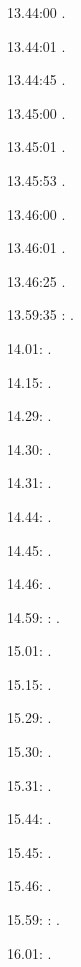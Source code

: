 \documentclass[italian]{article}
\begin{document}
13.44:00     .

13.44:01     .

13.44:45     .

13.45:00     .

13.45:01     .

13.45:53     .

13.46:00     .

13.46:01     .

13.46:25     .

13.59:35     
:    .

14.01:     . 

14.15:     . 

14.29:     . 

14.30:     .

14.31:     .

14.44:     .

14.45:     .

14.46:     .

14.59:     
:    .

15.01:     . 

15.15:     . 

15.29:     . 

15.30:     .

15.31:     .

15.44:     .

15.45:     .

15.46:     .

15.59:     
:    .

16.01:     . 
\end{document}
